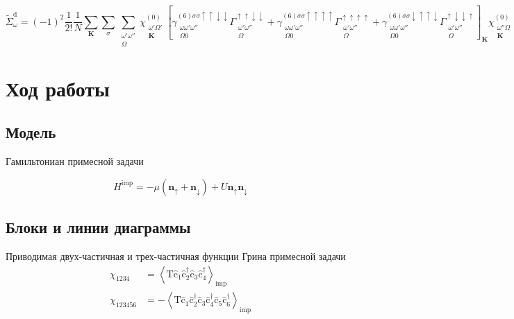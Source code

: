 \documentclass[11pt,a4paper]{report}
\begin{document}
\begin{equation}
 \tilde{\Sigma}^\text{d}_\omega = (-1)^2 \frac{1}{2!} \frac{1}{N} \sum_{\mathbf{K}} \sum_{\sigma}\sum_{\substack{\omega'\omega''\\\Omega}}
 \chi_{\substack{\omega'\Omega'\\\mathbf{K}}}^{(0)} \left[
  \gamma^{(6)\sigma\sigma\uparrow\uparrow\downarrow\downarrow}_{\substack{\omega\omega'\omega''\\\Omega 0}} \Gamma^{\uparrow\uparrow\downarrow\downarrow}_{\substack{\omega'\omega''\\\Omega}} +
  \gamma^{(6)\sigma\sigma\uparrow\uparrow\uparrow\uparrow}_{\substack{\omega\omega'\omega''\\\Omega 0}}\Gamma^{\uparrow\uparrow\uparrow\uparrow}_{\substack{\omega'\omega''\\\Omega}} +
  \gamma^{(6)\sigma\sigma\downarrow\uparrow\uparrow\downarrow}_{\substack{\omega\omega'\omega''\\\Omega 0}} \Gamma^{\uparrow\downarrow\downarrow\uparrow}_{\substack{\omega'\omega''\\\Omega}} 
  \right]_\mathbf{K}
  \chi_{\substack{\omega''\Omega\\\mathbf{K}}}^{(0)}
\end{equation}

\chapter{Ход работы}

\section{Модель}

Гамильтониан примесной задачи

\begin{equation}
 H^{\text{imp}} = -\mu(\mathbf{n}_\uparrow+\mathbf{n}_\downarrow) + U\mathbf{n}_\uparrow\mathbf{n}_\downarrow
\end{equation}

\section{Блоки и линии диаграммы}

Приводимая двух-частичная и трех-частичная функции Грина примесной задачи
\begin{equation}
\begin{split}
\chi_{1234} &= \left<\mathrm{T}\hat{\mathrm{c}}_1\hat{\mathrm{c}}^\dagger_2\hat{\mathrm{c}}_3\hat{\mathrm{c}}^\dagger_4\right>_\text{imp} \\
\chi_{123456} &= -\left<\mathrm{T}\hat{\mathrm{c}}_1\hat{\mathrm{c}}^\dagger_2\hat{\mathrm{c}}_3\hat{\mathrm{c}}^\dagger_4\hat{\mathrm{c}}_5\hat{\mathrm{c}}^\dagger_6\right>_\text{imp}
\end{split}
\end{equation}
\end{document}

